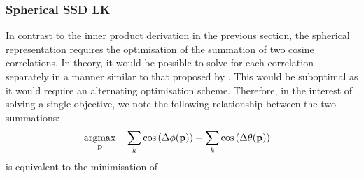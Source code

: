 \subsubsection{Spherical SSD LK}\label{subsubsec:lk-spherical}
In contrast to the inner product derivation in the previous section, the
spherical representation requires the optimisation of the summation of two
cosine correlations. In theory, it would be possible to solve for each
correlation separately in a manner similar to that proposed
by \citet{RefWorks:6}. This would be suboptimal as it would require an
alternating optimisation scheme. Therefore, in the interest of solving a single 
objective, we note the following relationship between the two summations:
\begin{equation}
    \begin{aligned}\label{eq:argmax_spherical}
        \argmax_{\p} \quad &\sum_k \cos{\left(\Delta \phi(\p)\right)} + \sum_k \cos{\left(\Delta \theta(\p)\right)}
    \end{aligned}
\end{equation}
is equivalent to the minimisation of
